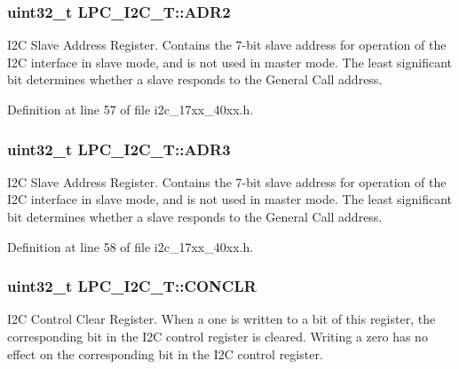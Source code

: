 \subsubsection[{\texorpdfstring{A\+D\+R2}{ADR2}}]{ uint32\+\_\+t L\+P\+C\+\_\+\+I2\+C\+\_\+\+T\+::\+A\+D\+R2}\hypertarget{structLPC__I2C__T_aad3c43c326c675b3c9a02936f7b906fa}{}\label{structLPC__I2C__T_aad3c43c326c675b3c9a02936f7b906fa}
I2C Slave Address Register. Contains the 7-\/bit slave address for operation of the I2C interface in slave mode, and is not used in master mode. The least significant bit determines whether a slave responds to the General Call address. 

Definition at line 57 of file i2c\+\_\+17xx\+\_\+40xx.\+h.

\subsubsection[{\texorpdfstring{A\+D\+R3}{ADR3}}]{ uint32\+\_\+t L\+P\+C\+\_\+\+I2\+C\+\_\+\+T\+::\+A\+D\+R3}\hypertarget{structLPC__I2C__T_a554732a259fca555bcec4201d756e945}{}\label{structLPC__I2C__T_a554732a259fca555bcec4201d756e945}
I2C Slave Address Register. Contains the 7-\/bit slave address for operation of the I2C interface in slave mode, and is not used in master mode. The least significant bit determines whether a slave responds to the General Call address. 

Definition at line 58 of file i2c\+\_\+17xx\+\_\+40xx.\+h.

\subsubsection[{\texorpdfstring{C\+O\+N\+C\+LR}{CONCLR}}]{ uint32\+\_\+t L\+P\+C\+\_\+\+I2\+C\+\_\+\+T\+::\+C\+O\+N\+C\+LR}\hypertarget{structLPC__I2C__T_a091c12dd25fb7db692339da933c8b523}{}\label{structLPC__I2C__T_a091c12dd25fb7db692339da933c8b523}
I2C Control Clear Register. When a one is written to a bit of this register, the corresponding bit in the I2C control register is cleared. Writing a zero has no effect on the corresponding bit in the I2C control register. 

